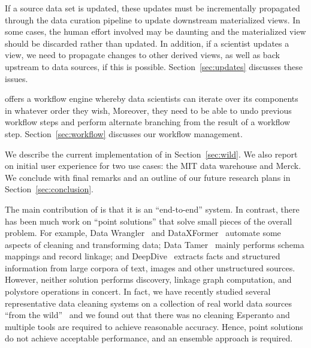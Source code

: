 \stitle{[Updates.]}  
If a source data set is updated, these updates must be incrementally propagated through the data curation pipeline to update downstream materialized views. 
In some cases, the human effort involved may be daunting and the materialized view should be discarded rather than updated. 
In addition, if a scientist updates a view, we need to propagate changes to other derived views, as well as back upstream to data sources, if this is possible. Section~\ref{sec:updates} discusses these  issues.



\stitle{[Workflow.]} 
\dcv offers a workflow engine whereby data scientists can iterate over its components in whatever order they wish,  Moreover, they need to be able to undo previous workflow steps and perform alternate branching from the result of a workflow step.  Section~\ref{sec:workflow} discusses our workflow management.

\smallskip

We describe the current implementation of \dcv in Section~\ref{sec:wild}. We also report on initial user experience for two use cases: the MIT data warehouse and Merck. We conclude with final remarks and an outline of our future research plans in Section~\ref{sec:conclusion}.


The main contribution of \dcv is that it is an ``end-to-end'' system. In contrast, there has been much work on ``point solutions'' that solve small pieces of the overall problem. For example, Data Wrangler~\cite{2011-wrangler} and DataXFormer~\cite{DBLP:conf/icde/AbedjanMIOPS16} automate some aspects of cleaning and transforming data;  Data Tamer~\cite{DBLP:conf/cidr/StonebrakerBIBCZPX13} mainly performs schema mappings and record linkage; and  DeepDive~\cite{DBLP:journals/pvldb/ShinWWSZR15} extracts facts and structured information from large corpora of text, images and other unstructured sources. However, neither solution performs  discovery, linkage graph computation, and polystore operations in concert.
In fact, we have recently studied several representative data cleaning systems on a collection of real world data sources ``from the wild''~\cite{DBLP:journals/pvldb/AbedjanCDFIOPST16} and we found out that there was no cleaning Esperanto and multiple tools are required to achieve reasonable accuracy.  
Hence, point solutions do not achieve acceptable performance, and an ensemble approach is required.


